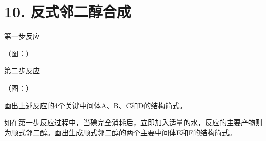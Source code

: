 \section*{10. 反式邻二醇合成}
第⼀步反应

（图：）

第⼆步反应

（图：）

画出上述反应的4个关键中间体A、B、C和D的结构简式。

如在第⼀步反应过程中，当碘完全消耗后，⽴即加⼊适量的⽔，反应的主要产物则为顺式邻⼆醇。画出⽣成顺式邻⼆醇的两个主要中间体E和F的结构简式。
